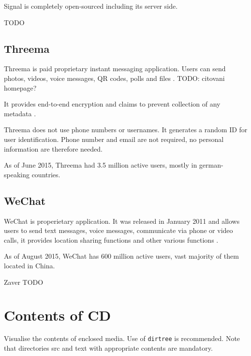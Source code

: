 \documentclass[thesis=M,english]{FITthesis}[2012/10/20]
\begin{document}
Signal is completely open-sourced including its server side.

TODO

\section{Threema}

Threema is paid proprietary instant messaging application. Users can send  photos, videos, voice messages, QR codes, polls and files \cite{threemahomepage}. TODO: citovani homepage?

It provides end-to-end encryption and claims to prevent collection of any metadata \cite{threemahomepage}.

Threema does not use phone numbers or usernames. It generates a random ID for user identification. Phone number and email are not required, no personal information are therefore needed.

As of June 2015, Threema had 3.5 million active users, mostly in german-speaking countries.\cite{threemausers}

\section{WeChat}

WeChat is properietary application. It was released in January 2011 and allows users to send text messages, voice messages, communicate via phone or video calls, it provides location sharing functions and other various functions \cite{wechatfeatures}.

As of August 2015, WeChat has 600 million active users, vast majority of them located in China.\cite{wechatusers}

\begin{conclusion}

Zaver TODO
	

\end{conclusion}




\appendix


\chapter{Contents of CD}\label{app:CDcontent}

Visualise the contents of enclosed media. Use of \verb|dirtree| is recommended. Note that directories src and text with appropriate contents are mandatory.
\end{document}

